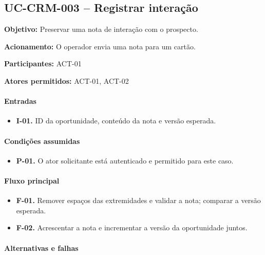 \documentclass[10pt,a4paper]{article}
\begin{document}
\subsection{UC-CRM-003 -- Registrar interação}

\textbf{Objetivo:} Preservar uma nota de interação com o prospecto.

\textbf{Acionamento:} O operador envia uma nota para um cartão.

\textbf{Participantes:} ACT-01

\textbf{Atores permitidos:} ACT-01, ACT-02

\paragraph{Entradas}

\begin{itemize}

\item \textbf{I-01.} ID da oportunidade, conteúdo da nota e versão esperada.

\end{itemize}

\paragraph{Condições assumidas}

\begin{itemize}

\item \textbf{P-01.} O ator solicitante está autenticado e permitido para este caso.

\end{itemize}

\paragraph{Fluxo principal}

\begin{itemize}

\item \textbf{F-01.} Remover espaços das extremidades e validar a nota; comparar a versão esperada.

\item \textbf{F-02.} Acrescentar a nota e incrementar a versão da oportunidade juntos.

\end{itemize}

\paragraph{Alternativas e falhas}
\end{document}
